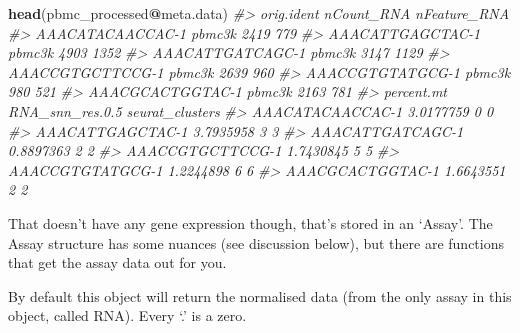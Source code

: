 \documentclass[
]{book}
\newenvironment{Shaded}{\begin{snugshade}}{\end{snugshade}}
\newcommand{\CommentTok}[1]{\textcolor[rgb]{0.56,0.35,0.01}{\textit{#1}}}
\newcommand{\FunctionTok}[1]{\textcolor[rgb]{0.13,0.29,0.53}{\textbf{#1}}}
\newcommand{\NormalTok}[1]{#1}
\newcommand{\SpecialCharTok}[1]{\textcolor[rgb]{0.81,0.36,0.00}{\textbf{#1}}}
\begin{document}
\begin{Shaded}
\begin{Highlighting}[]
\FunctionTok{head}\NormalTok{(pbmc\_processed}\SpecialCharTok{@}\NormalTok{meta.data)}
\CommentTok{\#\textgreater{}                  orig.ident nCount\_RNA nFeature\_RNA}
\CommentTok{\#\textgreater{} AAACATACAACCAC{-}1     pbmc3k       2419          779}
\CommentTok{\#\textgreater{} AAACATTGAGCTAC{-}1     pbmc3k       4903         1352}
\CommentTok{\#\textgreater{} AAACATTGATCAGC{-}1     pbmc3k       3147         1129}
\CommentTok{\#\textgreater{} AAACCGTGCTTCCG{-}1     pbmc3k       2639          960}
\CommentTok{\#\textgreater{} AAACCGTGTATGCG{-}1     pbmc3k        980          521}
\CommentTok{\#\textgreater{} AAACGCACTGGTAC{-}1     pbmc3k       2163          781}
\CommentTok{\#\textgreater{}                  percent.mt RNA\_snn\_res.0.5 seurat\_clusters}
\CommentTok{\#\textgreater{} AAACATACAACCAC{-}1  3.0177759               0               0}
\CommentTok{\#\textgreater{} AAACATTGAGCTAC{-}1  3.7935958               3               3}
\CommentTok{\#\textgreater{} AAACATTGATCAGC{-}1  0.8897363               2               2}
\CommentTok{\#\textgreater{} AAACCGTGCTTCCG{-}1  1.7430845               5               5}
\CommentTok{\#\textgreater{} AAACCGTGTATGCG{-}1  1.2244898               6               6}
\CommentTok{\#\textgreater{} AAACGCACTGGTAC{-}1  1.6643551               2               2}
\end{Highlighting}
\end{Shaded}

That doesn't have any gene expression though, that's stored in an `Assay'.
The Assay structure has some nuances (see discussion below), but there are functions that get the assay data out for you.

By default this object will return the normalised data (from the only assay in this object, called RNA). Every `.' is a zero.
\end{document}
